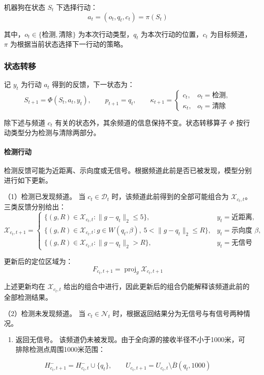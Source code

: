 机器狗在状态 \(S_t\) 下选择行动：
\[
a_t=(o_t,q_t,c_t)=\pi(S_t)
\tag{21}
\]

其中，\(o_t\in\{\text{检测},\text{清除}\}\) 为本次行动类型，\(q_t\) 为本次行动的位置，\(c_t\) 为目标频道，\(\pi\) 为根据当前状态选择下一行动的策略。

\subsubsection{状态转移}

记 \(y_t\) 为行动 \(a_t\) 得到的反馈，下一状态为：
\[
S_{t+1}=\Phi(S_t,a_t,y_t),
\qquad
p_{t+1}=q_t,
\qquad
\kappa_{t+1}=
\begin{cases}
c_t,&o_t=\text{检测},\\
\kappa_t,&o_t=\text{清除}
\end{cases}
\tag{22}
\]

除下述与频道 \(c_t\) 有关的状态外，其余频道的信息保持不变。状态转移算子 \(\Phi\) 按行动类型分为检测与清除两部分。

\paragraph{检测行动}

检测反馈可能为近距离、示向度或无信号。根据频道此前是否已被发现，模型分别进行如下更新。

（1）检测已发现频道。 当 \(c_t\in\mathcal D_t\) 时，该频道此前得到的全部可能组合为 \(\mathcal X_{c_t,t}\)。三类反馈分别给出：
\[
\mathcal X_{c_t,t+1}=
\begin{cases}
\{(g,R)\in\mathcal X_{c_t,t}:\|g-q_t\|_2\le5\},
&y_t=\text{近距离},\\[1mm]
\{(g,R)\in\mathcal X_{c_t,t}:g\in W(q_t,\beta),\ 5<\|g-q_t\|_2\le R\},
&y_t=\text{示向度 }\beta,\\[1mm]
\{(g,R)\in\mathcal X_{c_t,t}:\|g-q_t\|_2>R\},
&y_t=\text{无信号}
\end{cases}
\tag{23a}
\]

更新后的定位区域为：
\[
F_{c_t,t+1}=\operatorname{proj}_g\mathcal X_{c_t,t+1}
\]

上述更新均在 \(\mathcal X_{c_t,t}\) 给出的组合中进行，因此更新后的组合仍能解释该频道此前的全部检测结果。

（2）检测未发现频道。 当 \(c_t\in\mathcal N_t\) 时，根据返回结果分为无信号与有信号两种情况。

\begin{enumerate}
\def\labelenumi{\arabic{enumi}.}
\tightlist
\item
  返回无信号。 该频道仍未被发现。由于全向源的接收半径不小于1000米，可排除检测点周围1000米范围：
\end{enumerate}
\[
H^-_{c_t,t+1}=H^-_{c_t,t}\cup\{q_t\},
   \qquad
   U_{c_t,t+1}=U_{c_t,t}\setminus\overline B(q_t,1000)
   \tag{23b}
\]

